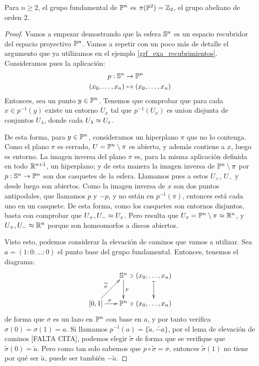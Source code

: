 \begin{theo}
	\label{grf_espacio_proyectivo}
	
	Para $n\geq 2$, el grupo fundamental de  $\mathbb{P}^n$ es $\pi(\mathbb{P}^2)=\mathbb{Z}_2$, el grupo abeliano de orden 2.
	
	\begin{proof}
		Vamos a empezar demostrando que la esfera $\mathbb{S}^n$ es un espacio recubridor del espacio proyectivo $\mathbb{P}^n$. Vamos a repetir con un poco más de detalle el argumento que ya utilizamos en el ejemplo \ref{grf_exa_recubrimientos}. Consideramos pues la aplicación:
		\[\begin{split}
		p:\mathbb{S}^n&\to\mathbb{P}^n \\
		(x_0,\dots,x_n)&\mapsto (x_0,\dotsc,x_n)
		\end{split}\]
		Entonces, sea un punto $y\in\mathbb{P}^n$. Tenemos que comprobar que para cada $x\in p^{-1}(y)$ existe un entorno $U_x$ tal que $p^{-1}(U_x)$ es union disjunta de conjuntos $U_\lambda$, donde cada $U_\lambda\approx U_x$.
		
		De esta forma, para $y\in\mathbb{P}^n$, consideramos un hiperplano $\pi$ que no lo contenga. Como el plano $\pi$ es cerrado, $U=\mathbb{P}^n\setminus\pi$ es abierto, y además contiene a $x$, luego es entorno. La imagen inversa del plano $\pi$ es, para la misma aplicación definida en todo $\mathbb{R}^{n+1}$, un hiperplano; y de esta manera la imagen inversa de $\mathbb{P}^n\setminus\pi$ por $p:\mathbb{S}^n\to\mathbb{P}^n$ son dos casquetes de la esfera. Llamamos pues a estos $U_+$, $U_-$ y desde luego son abiertos. Como la imagen inversa de $x$ son dos puntos antipodales, que llamamos $p$ y $-p$, y no están en $p^{-1}(\pi)$, entonces está cada uno en un casquete. De esta forma, como los casquetes son entornos disjuntos, basta con comprobar que $U_+,U_-\approx U_x$. Pero resulta que $U_x = \mathbb{P}^n\setminus\pi\approx\mathbb{R}^n$, y $U_+,U_-\approx\mathbb{R}^n$ porque son homeomorfos a discos abiertos.
		
		Visto esto, podemos considerar la elevación de caminos que vamos a utilizar. Sea $a=(1:0:\dotsc:0)$ el punto base del grupo fundamental. Entonces, tenemos el diagrama:
		\[\xymatrix @C = 0.5pc {
			&& \Sfe^n \ar[d]^p & (x_0,\dots,x_n) \ar@{|->}[d] \ar@{}[l]|-\ni \\
			[0,1] \ar[rr]^\sigma \ar[rru]^{\widetilde{\sigma}} && \proy^n & (x_0,\dotsc,x_n) \ar@{}[l]|-\ni
		}\]
		de forma que $\sigma$ es un lazo en $\mathbb{P}^n$ con base en $a$, y por tanto verifica $\sigma(0)=\sigma(1)=a$. Si llamamos $p^{-1}(a)=\{\widetilde{a},\widetilde{-a}\}$, por el lema de elevación de caminos [FALTA CITA], podemos elegir $\widetilde{\sigma}$ de forma que se verifique que $\widetilde{\sigma}(0)=\widetilde{a}$. Pero como tan solo sabemos que $p\circ\widetilde{\sigma}=\sigma$, entonces $\widetilde{\sigma}(1)$ no tiene por qué ser $\widetilde{a}$, puede ser también $-\widetilde{a}$. %
		

\end{proof}
\end{theo}
